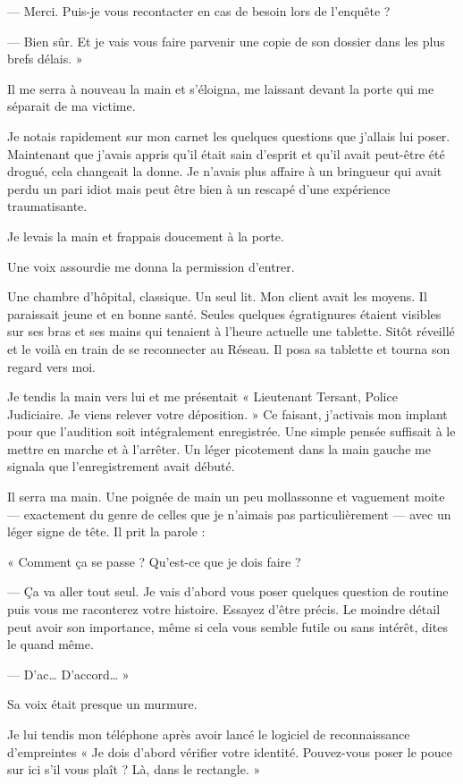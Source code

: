 — Merci. Puis-je vous recontacter en cas de besoin lors de l'enquête ?

— Bien sûr. Et je vais vous faire parvenir une copie de son dossier dans les plus brefs délais. »

Il me serra à nouveau la main et s'éloigna, me laissant devant la porte qui me séparait de ma victime.

Je notais rapidement sur mon carnet les quelques questions que j'allais lui poser. Maintenant que j'avais appris qu'il
était sain d'esprit et qu'il avait peut-être été drogué, cela changeait la donne. Je n'avais plus affaire à un bringueur
qui avait perdu un pari idiot mais peut être bien à un rescapé d'une expérience traumatisante.

Je levais la main et frappais doucement à la porte.

Une voix assourdie me donna la permission d'entrer.

Une chambre d'hôpital, classique. Un seul lit. Mon client avait les moyens. Il paraissait jeune et en bonne santé.
Seules quelques égratignures étaient visibles sur ses bras et ses mains qui tenaient à l'heure actuelle une tablette.
Sitôt réveillé et le voilà en train de se reconnecter au Réseau. Il posa sa tablette et tourna son regard vers moi.

Je tendis la main vers lui et me présentait « Lieutenant Tersant, Police Judiciaire. Je viens relever votre déposition.
» Ce faisant, j'activais mon implant pour que l'audition soit intégralement enregistrée. Une simple pensée suffisait à
le mettre en marche et à l'arrêter. Un léger picotement dans la main gauche me signala que l'enregistrement avait
débuté.

Il serra ma main. Une poignée de main un peu mollassonne et vaguement moite — exactement du genre de celles que je
n'aimais pas particulièrement — avec un léger signe de tête. Il prit la parole :

« Comment ça se passe ? Qu'est-ce que je dois faire ?

— Ça va aller tout seul. Je vais d'abord vous poser quelques question de routine puis vous me raconterez votre
histoire. Essayez d'être précis. Le moindre détail peut avoir son importance, même si cela vous semble futile ou sans
intérêt, dites le quand même.

— D'ac… D'accord… »

Sa voix était presque un murmure.

Je lui tendis mon téléphone après avoir lancé le logiciel de reconnaissance d'empreintes « Je dois d'abord vérifier
votre identité. Pouvez-vous poser le pouce sur ici s'il vous plaît ? Là, dans le rectangle. »

